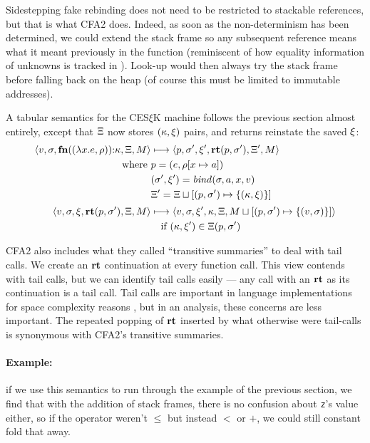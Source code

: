 Sidestepping fake rebinding does not need to be restricted to stackable references, but that is what CFA2 does.
%
Indeed, as soon as the non-determinism has been determined, we could extend the stack frame so any subsequent reference means what it meant previously in the function (reminiscent of how equality information of unknowns is tracked in \citet{ianjohnson:DBLP:journals/cacm/DilligDA10}).
%
Look-up would then always try the stack frame before falling back on the heap (of course this must be limited to immutable addresses).

A tabular semantics for the CES$\xi$K machine follows the previous section almost entirely, except that $\Xi$ now stores $(\kappa, \xi)$ pairs, and returns reinstate the saved $\xi$:
\begin{align*}
  \langle v,\sigma,\mathbf{fn}{}((\lambda{} x. e, \rho)){\tt :} \kappa,\Xi,M \rangle &\longmapsto
  \langle p,
    \sigma',
    \xi',
    \mathbf{rt}(p, \sigma'),
    \Xi',
    M \rangle \\
  \text{where }
  & p = (e, \rho[x \mapsto a]) \\
  & (\sigma',\xi') = \mathit{bind}(\sigma,a,x,v) \\
  & \Xi' = \Xi\sqcup[(p, \sigma') \mapsto \{ (\kappa,\xi) \}]
\\[2pt]
 \langle v, \sigma, \xi, \mathbf{rt}(p,\sigma'), \Xi, M \rangle &\longmapsto
 \langle v, \sigma, \xi', \kappa, \Xi, M\sqcup[(p, \sigma') \mapsto \{ (v,\sigma) \}] \rangle
  \\ & \quad\text{if } (\kappa,\xi') \in \Xi(p, \sigma')
\end{align*}

CFA2 also includes what they called ``transitive summaries'' to deal with tail calls.
%
We create an $\mathbf{rt}$ continuation at every function call.
%
This view contends with tail calls, but we can identify tail calls easily --- any call with an $\mathbf{rt}$ as its continuation is a tail call.
%
Tail calls are important in language implementations for space complexity reasons \citep{ianjohnson:clinger:tail-calls:1998}, but in an analysis, these concerns are less important.
%
The repeated popping of $\mathbf{rt}$ inserted by what otherwise were tail-calls is synonymous with CFA2's transitive summaries.

\paragraph{Example:} if we use this semantics to run through the example of the previous section, we find that with the addition of stack frames, there is no confusion about \texttt{z}'s value either, so if the operator weren't $\le$ but instead $<$ or $+$, we could still constant fold that away.

